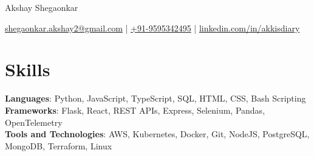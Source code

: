 \documentclass[11pt]{article}       %
\begin{document}
\centerline{\Huge Akshay Shegaonkar}

\vspace{5pt}

\centerline{\href{mailto:shegaonkar.akshay2@gmail.com}{shegaonkar.akshay2@gmail.com} | \href{tel:+919595342495}{+91-9595342495} | \href{https://www.linkedin.com/in/akkisdiary}{linkedin.com/in/akkisdiary}}

\vspace{-10pt}

\section*{Skills}
\textbf{Languages}: Python, JavaScript, TypeScript, SQL, HTML, CSS, Bash Scripting \\
\textbf{Frameworks}: Flask, React, REST APIs, Express, Selenium, Pandas, OpenTelemetry \\
\textbf{Tools and Technologies}: AWS, Kubernetes, Docker, Git, NodeJS, PostgreSQL, MongoDB, Terraform, Linux \\
\vspace{-6.5pt}

\end{document}
